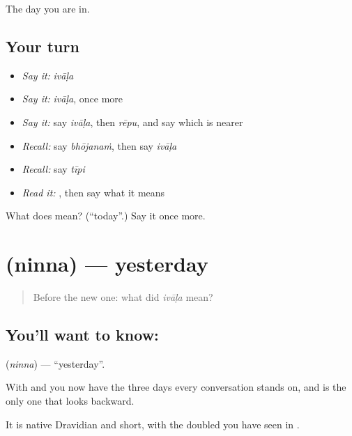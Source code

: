 \begin{grammarlens}[title={What you've built}]
The day you are in.
\end{grammarlens}

\subsection*{Your turn}
\begin{itemize}
\raggedright
  \item \emph{Say it:} \emph{ivāḷa}
  \item \emph{Say it:} \emph{ivāḷa}, once more
  \item \emph{Say it:} say \emph{ivāḷa}, then \emph{rēpu}, and say which is nearer
  \item \emph{Recall:} say \emph{bhōjanaṁ}, then say \emph{ivāḷa}
  \item \emph{Recall:} say \emph{tīpi}
  \item \emph{Read it:} \textbf{}, then say what it means
\end{itemize}

\begin{tcolorbox}[breakable,colback=teal!4,colframe=teal!35!black,title={Before you move on}]
What does  mean? (\textquotedblleft{}today\textquotedblright{}.) Say it once more.
\end{tcolorbox}
\section[\texorpdfstring{\te{నిన్న} (ninna)}{నిన్న (ninna)}]{ (ninna) — yesterday}

\label{lesson:TE-C75-yesterday}



\begin{quote}
Before the new one: what did \emph{ivāḷa} mean?
\end{quote}

\subsection*{You'll want to know: }
\textbf{} (\emph{ninna}) — \textquotedblleft{}yesterday\textquotedblright{}.

With  and  you now have the three days every conversation stands on, and  is the only one that looks backward.

It is native Dravidian and short, with the doubled \textbf{} you have seen in .

